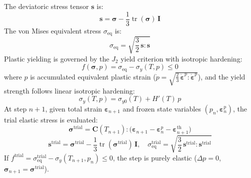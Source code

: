 \documentclass[10pt,a4paper]{article}
\begin{document}
The deviatoric stress tensor $\mathbf{s}$ is:
\begin{equation}
\mathbf{s} = \boldsymbol{\sigma} - \frac{1}{3}\operatorname{tr}(\boldsymbol{\sigma})\,\mathbf{I}
\end{equation}
The von Mises equivalent stress $\sigma_{\mathrm{eq}}$ is:
\begin{equation}
\sigma_{\mathrm{eq}} = \sqrt{\frac{3}{2}\,\mathbf{s} : \mathbf{s}}
\end{equation}
Plastic yielding is governed by the $J_2$ yield criterion with isotropic hardening:
\begin{equation}
f(\boldsymbol{\sigma}, p) = \sigma_{\mathrm{eq}} - \sigma_y(T, p) \le 0
\end{equation}
where $p$ is accumulated equivalent plastic strain ($\dot{p} = \sqrt{\frac{2}{3}\,\dot{\boldsymbol{\varepsilon}}^p : \dot{\boldsymbol{\varepsilon}}^p}$), and the yield strength follows linear isotropic hardening:
\begin{equation}
\sigma_y(T, p) = \sigma_{y0}(T) + H'(T)\,p
\end{equation}
At step $n+1$, given total strain $\boldsymbol{\varepsilon}_{n+1}$ and frozen state variables $(p_n, \boldsymbol{\varepsilon}^p_n)$, the trial elastic stress is evaluated:
\begin{equation}
\boldsymbol{\sigma}^{\mathrm{trial}} = \mathbf{C}(T_{n+1}) : \bigl(\boldsymbol{\varepsilon}_{n+1} - \boldsymbol{\varepsilon}^p_n - \boldsymbol{\varepsilon}^{\mathrm{th}}_{n+1}\bigr)
\end{equation}
\begin{equation}
\mathbf{s}^{\mathrm{trial}} = \boldsymbol{\sigma}^{\mathrm{trial}} - \frac{1}{3}\operatorname{tr}(\boldsymbol{\sigma}^{\mathrm{trial}})\,\mathbf{I}, \quad \sigma_{\mathrm{eq}}^{\mathrm{trial}} = \sqrt{\frac{3}{2}\,\mathbf{s}^{\mathrm{trial}} : \mathbf{s}^{\mathrm{trial}}}
\end{equation}
If $f^{\mathrm{trial}} = \sigma_{\mathrm{eq}}^{\mathrm{trial}} - \sigma_y(T_{n+1}, p_n) \le 0$, the step is purely elastic ($\Delta p = 0$, $\boldsymbol{\sigma}_{n+1} = \boldsymbol{\sigma}^{\mathrm{trial}}$).
\end{document}
